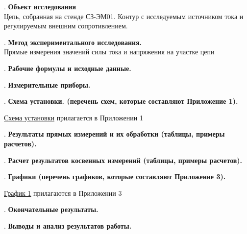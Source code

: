 \documentclass[12pt]{article}
\begin{document}
    \mediumvspace

    . \textbf{Объект исследования} \\
    Цепь, собранная на стенде СЗ-ЭМ01. Контур с исследуемым источником тока и регулируемым внешним сопротивлением.


    \mediumvspace

    . \textbf{Метод экспериментального исследования.} \\
    Прямые измерения значений силы тока и напряжения на участке цепи

    \newpage

    . \textbf{Рабочие формулы и исходные данные.}

    

    \mediumvspace

    . \textbf{Измерительные приборы.}

    \smallvspace

    

    \mediumvspace

    . \textbf{Схема установки. (перечень схем, которые составляют Приложение 1).}

    \hyperlink{schema1}{Схема установки} прилагается в Приложении 1

    \mediumvspace

    . \textbf{Результаты прямых измерений и их обработки (таблицы, примеры расчетов).}

    

    \mediumvspace

    . \textbf{Расчет результатов косвенных измерений (таблицы, примеры расчетов).}

    

    \mediumvspace

    . \textbf{Графики (перечень графиков, которые составляют Приложение 3).}

    \hyperlink{diagram1}{График 1} прилагаются в Приложении 3

    \mediumvspace

    . \textbf{Окончательные результаты.}

    

    \mediumvspace

    . \textbf{Выводы и анализ результатов работы.}
\end{document}
